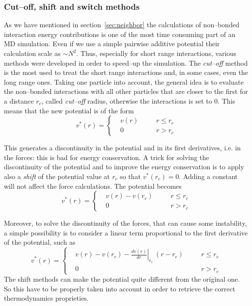 \subsubsection{Cut--off, shift and switch methods}
As we have mentioned in section~\ref{sec:neighbor} the calculations of non--bonded interaction energy
contributions is one of the most time consuming part of an \ac{MD} simulation. Even if we use a simple pairwise
additive potential their calculation scale as $\sim N^2$. Thus, especially for short range interactions, various
methods were developed in order to speed--up the simulation. The \textit{cut--off} method is the most used to
treat the short range interactions and, in some cases, even the long range ones. Taking one particle into
account, the general idea is to evaluate the non--bonded interactions with all other particles that are closer to
the first for a distance $r_c$, called \textit{cut--off} radius, otherwise the interactions is set to $0$. This
means that the new potential is of the form
\begin{equation*}
v^*(r) = \left \{
	\begin{aligned}
&v(r) & \quad & r \le r_c \\
&0    & \quad & r >   r_c
	\end{aligned} \right .
\end{equation*}

This generates a discontinuity in the potential and in its first derivatives, i.e. in the forces: this is bad for
energy conservation. A trick for solving the discontinuity of the potential and to improve the energy
conservation is to apply also a \textit{shift} of the potential value at $r_c$ so that $v^*(r_c) = 0$. Adding a
constant will not affect the force calculations. The potential becomes
\begin{equation*}
v^*(r) = \left \{
	\begin{aligned}
&v(r) - v(r_c) & \quad & r \le r_c \\
&0    & \quad  & r >   r_c
	\end{aligned} \right .
\end{equation*}

Moreover, to solve the discontinuity of the forces, that can cause some instability, a simple possibility is to
consider a linear term proportional to the first derivative of the potential, such as
\begin{equation*}
v^*(r) = \left \{
	\begin{aligned}
&v(r) - v(r_c) - \left . \frac{dv(r)}{dr}\right |_{r_c}\ (r - r_c) & \quad & r \le r_c \\
&0    & \quad  & r >   r_c
	\end{aligned} \right .
\end{equation*}
The shift methods can make the potential quite different from the original one. So this have to be properly taken
into account in order to retrieve the correct thermodynamics proprieties.

